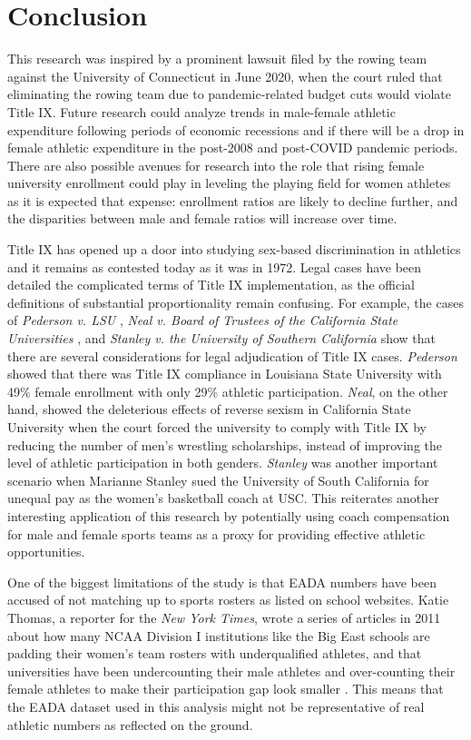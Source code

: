 \documentclass[11pt]{article}
\begin{document}
\section{Conclusion}
This research was inspired by a prominent lawsuit filed by the rowing team against the University of Connecticut in June 2020, when the court ruled that eliminating the rowing team due to pandemic-related budget cuts would violate Title IX. Future research could analyze trends in male-female athletic expenditure following periods of economic recessions and if there will be a drop in female athletic expenditure in the post-2008 and post-COVID pandemic periods. There are also possible avenues for research into the role that rising female university enrollment could play in leveling the playing field for women athletes as it is expected that expense: enrollment ratios are likely to decline further, and the disparities between male and female ratios will increase over time.

Title IX has opened up a door into studying sex-based discrimination in athletics and it remains as contested today as it was in 1972. Legal cases have been detailed the complicated terms of Title IX implementation, as the official definitions of substantial proportionality remain confusing. For example, the cases of \emph{Pederson v. LSU} \cite{Pederson}, \emph{Neal v. Board of Trustees of the California State Universities} \cite{Neal}, and \emph{Stanley v. the University of Southern California} \cite{Stanley} show that there are several considerations for legal adjudication of Title IX cases. \emph{Pederson} showed that there was Title IX compliance in Louisiana State University with 49\% female enrollment with only 29\% athletic participation. \emph{Neal}, on the other hand, showed the deleterious effects of reverse sexism in California State University when the court forced the university to comply with Title IX by reducing the number of men's wrestling scholarships, instead of improving the level of athletic participation in both genders. \emph{Stanley} was another important scenario when Marianne Stanley sued the University of South California for unequal pay as the women's basketball coach at USC. This reiterates another interesting application of this research by potentially using coach compensation for male and female sports teams as a proxy for providing effective athletic opportunities.

One of the biggest limitations of the study is that EADA numbers have been accused of not matching up to sports rosters as listed on school websites. Katie Thomas, a reporter for the \emph{New York Times}, wrote a series of articles in 2011 about how many NCAA Division I institutions like the Big East schools are padding their women's team rosters with underqualified athletes, and that universities have been undercounting their male athletes and over-counting their female athletes to make their participation gap look smaller \cite{Thomas}. This means that the EADA dataset used in this analysis might not be representative of real athletic numbers as reflected on the ground.
\end{document}
